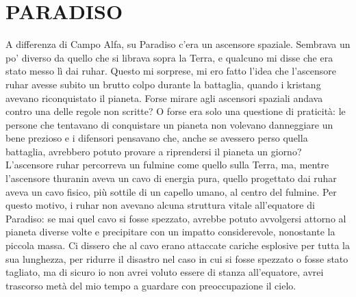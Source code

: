 \chapter{PARADISO}\label{paradiso}

\hfill\break

A differenza di Campo Alfa, su Paradiso c'era un ascensore spaziale.
Sembrava un po' diverso da quello che si librava sopra la Terra, e
qualcuno mi disse che era stato messo lì dai ruhar. Questo mi sorprese,
mi ero fatto l'idea che l'ascensore ruhar avesse subito un brutto colpo
durante la battaglia, quando i kristang avevano riconquistato il
pianeta. Forse mirare agli ascensori spaziali andava contro una delle
regole non scritte? O forse era solo una questione di praticità: le
persone che tentavano di conquistare un pianeta non volevano danneggiare
un bene prezioso e i difensori pensavano che, anche se avessero perso
quella battaglia, avrebbero potuto provare a riprendersi il pianeta un
giorno? L'ascensore ruhar percorreva un fulmine come quello sulla Terra,
ma, mentre l'ascensore thuranin aveva un cavo di energia pura, quello
progettato dai ruhar aveva un cavo fisico, più sottile di un capello
umano, al centro del fulmine. Per questo motivo, i ruhar non avevano
alcuna struttura vitale all'equatore di Paradiso: se mai quel cavo si
fosse spezzato, avrebbe potuto avvolgersi attorno al pianeta diverse
volte e precipitare con un impatto considerevole, nonostante la piccola
massa. Ci dissero che al cavo erano attaccate cariche esplosive per
tutta la sua lunghezza, per ridurre il disastro nel caso in cui si fosse
spezzato o fosse stato tagliato, ma di sicuro io non avrei voluto essere
di stanza all'equatore, avrei trascorso metà del mio tempo a guardare
con preoccupazione il cielo.

